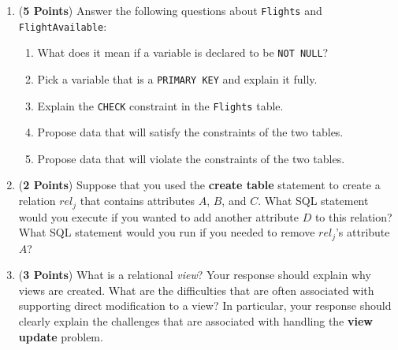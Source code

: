 \documentclass[12pt]{article}
\begin{document}
\begin{enumerate}
              \begin{enumerate}

                \item ({\bf 5 Points}) Answer the following questions about 
                  \texttt{Flights} and \texttt{FlightAvailable}:

                  \begin{enumerate}

                    \item What does it mean if a variable is declared to be \texttt{NOT NULL}?

                    \item Pick a variable that is a \texttt{PRIMARY KEY} and explain it fully.

                    \item Explain the \texttt{CHECK} constraint in the \texttt{Flights} table.

                    \item Propose data that will satisfy the constraints of the two tables.

                    \item Propose data that will violate the constraints of the
                      two tables.

                  \end{enumerate}

                \item ({\bf 2 Points}) Suppose that you used the {\bf create
                  table} statement to create a relation $rel_j$ that contains
                  attributes $A$, $B$, and $C$.  What SQL statement would you
                  execute if you wanted to add another attribute $D$ to this
                  relation?  What SQL statement would you run if you needed to
                  remove $rel_j$'s attribute $A$?

                \item ({\bf 3 Points}) What is a relational {\em view}?  Your
                  response should explain why views are created.  What are the
                  difficulties that are often associated with supporting direct
                  modification to a view?  In particular, your response should
                  clearly explain the challenges that are associated with handling
                  the {\bf view update} problem.

              \end{enumerate}


\end{enumerate}
\end{document}

